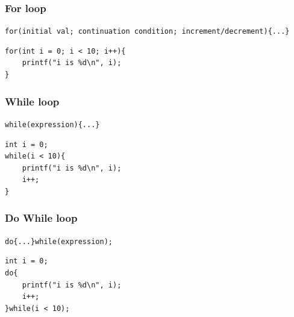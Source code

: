 \documentclass[a4paper, 10pt]{article}
\begin{document}
\subsubsection{For loop}
\texttt{for(initial val; continuation condition; increment/decrement)\{...\}}

\begin{lstlisting}[style=cStyle, caption={Print numbers from 0 to 9}]
for(int i = 0; i < 10; i++){
    printf("i is %d\n", i);
}
\end{lstlisting}

\subsubsection{While loop}
\texttt{while(expression)\{...\}}
\begin{lstlisting}[style=cStyle, caption={Print numbers from 0 to 9}]
int i = 0;
while(i < 10){
    printf("i is %d\n", i);
    i++;
}
\end{lstlisting}
\subsubsection{Do While loop}
\texttt{do\{...\}while(expression);}
\begin{lstlisting}[style=cStyle, caption={Print numbers from 0 to 9}]
int i = 0;
do{
    printf("i is %d\n", i);
    i++;
}while(i < 10);
\end{lstlisting}
\end{document}
